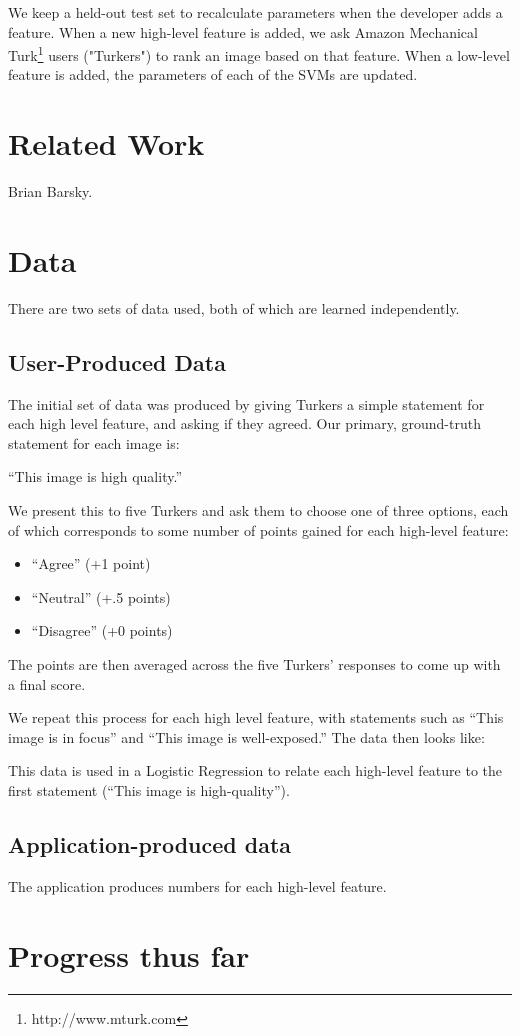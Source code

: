 \documentclass[10pt,twocolumn]{article}
\begin{document}
We keep a held-out test set to recalculate parameters when the developer adds a feature. When a new high-level feature is added, we ask Amazon Mechanical Turk\footnote{http://www.mturk.com} users ("Turkers") to rank an image based on that feature. When a low-level feature is added, the parameters of each of the SVMs are updated.

\section{Related Work}
Brian Barsky.

\section{Data}

There are two sets of data used, both of which are learned independently.

\subsection{User-Produced Data}
The initial set of data was produced by giving Turkers a simple statement for each high level feature, and asking if they agreed. Our primary, ground-truth statement for each image is:

``This image is high quality.''

We present this to five Turkers and ask them to choose one of three options, each of which corresponds to some number of points gained for each high-level feature:

\begin{itemize}
\item ``Agree'' (+1 point)
\item ``Neutral'' (+.5 points)
\item ``Disagree'' (+0 points)
\end{itemize}
The points are then averaged across the five Turkers' responses to come up with a final score.

We repeat this process for each high level feature, with statements such as ``This image is in focus'' and ``This image is well-exposed.'' The data then looks like:


This data is used in a Logistic Regression to relate each high-level feature to the first statement (``This image is high-quality'').

\subsection{Application-produced data}
The application produces numbers for each high-level feature.

\section{Progress thus far}
\end{document}
